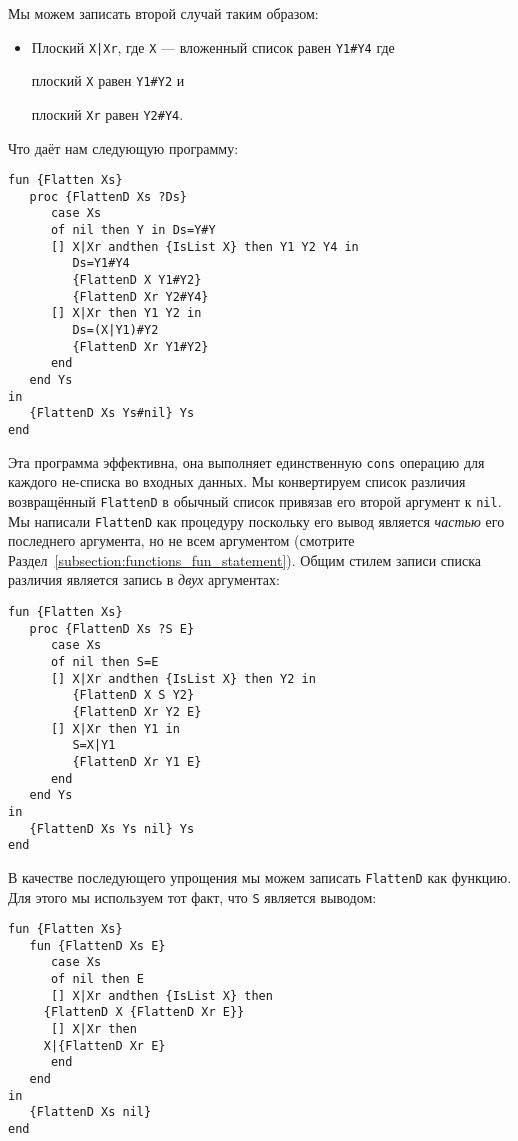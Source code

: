 Мы можем записать второй случай таким образом:

\begin{itemize}
\item{Плоский \lstinline!X|Xr!, где \lstinline!X! --- вложенный список равен \lstinline|Y1#Y4| где

  плоский \lstinline!X! равен \lstinline|Y1#Y2| и
  
  плоский \lstinline!Xr! равен \lstinline|Y2#Y4|.}
\end{itemize}

Что даёт нам следующую программу:

\begin{lstlisting}
fun {Flatten Xs}
   proc {FlattenD Xs ?Ds}
      case Xs
      of nil then Y in Ds=Y#Y
      [] X|Xr andthen {IsList X} then Y1 Y2 Y4 in
         Ds=Y1#Y4
         {FlattenD X Y1#Y2}
         {FlattenD Xr Y2#Y4}
      [] X|Xr then Y1 Y2 in
         Ds=(X|Y1)#Y2
         {FlattenD Xr Y1#Y2}
      end
   end Ys
in
   {FlattenD Xs Ys#nil} Ys
end
\end{lstlisting}

Эта программа эффективна, она выполняет единственную \lstinline!cons! операцию для каждого не-списка во входных данных. Мы конвертируем список различия возвращённый \lstinline!FlattenD! в обычный список привязав его второй аргумент к \lstinline!nil!. Мы написали \lstinline!FlattenD! как процедуру поскольку его вывод является \emph{частью} его последнего аргумента, но не всем аргументом (смотрите Раздел~\ref{subsection:functions_fun_statement}). Общим стилем записи списка различия является запись в \emph{двух} аргументах:

\begin{lstlisting}
fun {Flatten Xs}
   proc {FlattenD Xs ?S E}
      case Xs
      of nil then S=E
      [] X|Xr andthen {IsList X} then Y2 in
         {FlattenD X S Y2}
         {FlattenD Xr Y2 E}
      [] X|Xr then Y1 in
         S=X|Y1
         {FlattenD Xr Y1 E}
      end
   end Ys
in
   {FlattenD Xs Ys nil} Ys
end
\end{lstlisting}

В качестве последующего упрощения мы можем записать \lstinline!FlattenD! как функцию. Для этого мы используем тот факт, что \lstinline!S! является выводом:

\begin{lstlisting}
fun {Flatten Xs}
   fun {FlattenD Xs E}
      case Xs
      of nil then E
      [] X|Xr andthen {IsList X} then
	 {FlattenD X {FlattenD Xr E}}
      [] X|Xr then
	 X|{FlattenD Xr E}
      end
   end
in
   {FlattenD Xs nil}
end
\end{lstlisting}


